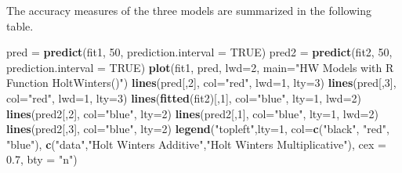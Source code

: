 \documentclass[
]{book}
\newenvironment{Shaded}{\begin{snugshade}}{\end{snugshade}}
\newcommand{\AttributeTok}[1]{\textcolor[rgb]{0.13,0.29,0.53}{#1}}
\newcommand{\ConstantTok}[1]{\textcolor[rgb]{0.56,0.35,0.01}{#1}}
\newcommand{\DecValTok}[1]{\textcolor[rgb]{0.00,0.00,0.81}{#1}}
\newcommand{\FloatTok}[1]{\textcolor[rgb]{0.00,0.00,0.81}{#1}}
\newcommand{\FunctionTok}[1]{\textcolor[rgb]{0.13,0.29,0.53}{\textbf{#1}}}
\newcommand{\NormalTok}[1]{#1}
\newcommand{\OtherTok}[1]{\textcolor[rgb]{0.56,0.35,0.01}{#1}}
\newcommand{\StringTok}[1]{\textcolor[rgb]{0.31,0.60,0.02}{#1}}
\begin{document}
The accuracy measures of the three models are summarized in the following table.

\begin{Shaded}
\begin{Highlighting}[]
\NormalTok{pred }\OtherTok{=} \FunctionTok{predict}\NormalTok{(fit1, }\DecValTok{50}\NormalTok{, }\AttributeTok{prediction.interval =} \ConstantTok{TRUE}\NormalTok{)}
\NormalTok{pred2 }\OtherTok{=} \FunctionTok{predict}\NormalTok{(fit2, }\DecValTok{50}\NormalTok{, }\AttributeTok{prediction.interval =} \ConstantTok{TRUE}\NormalTok{)}
\FunctionTok{plot}\NormalTok{(fit1, pred, }\AttributeTok{lwd=}\DecValTok{2}\NormalTok{, }\AttributeTok{main=}\StringTok{"HW Models with R Function HoltWinters()"}\NormalTok{)}
\FunctionTok{lines}\NormalTok{(pred[,}\DecValTok{2}\NormalTok{], }\AttributeTok{col=}\StringTok{"red"}\NormalTok{, }\AttributeTok{lwd=}\DecValTok{1}\NormalTok{, }\AttributeTok{lty=}\DecValTok{3}\NormalTok{)}
\FunctionTok{lines}\NormalTok{(pred[,}\DecValTok{3}\NormalTok{], }\AttributeTok{col=}\StringTok{"red"}\NormalTok{, }\AttributeTok{lwd=}\DecValTok{1}\NormalTok{, }\AttributeTok{lty=}\DecValTok{3}\NormalTok{)}
\FunctionTok{lines}\NormalTok{(}\FunctionTok{fitted}\NormalTok{(fit2)[,}\DecValTok{1}\NormalTok{], }\AttributeTok{col=}\StringTok{"blue"}\NormalTok{, }\AttributeTok{lty=}\DecValTok{1}\NormalTok{, }\AttributeTok{lwd=}\DecValTok{2}\NormalTok{)}
\FunctionTok{lines}\NormalTok{(pred2[,}\DecValTok{2}\NormalTok{], }\AttributeTok{col=}\StringTok{"blue"}\NormalTok{, }\AttributeTok{lty=}\DecValTok{2}\NormalTok{)}
\FunctionTok{lines}\NormalTok{(pred2[,}\DecValTok{1}\NormalTok{], }\AttributeTok{col=}\StringTok{"blue"}\NormalTok{, }\AttributeTok{lty=}\DecValTok{1}\NormalTok{, }\AttributeTok{lwd=}\DecValTok{2}\NormalTok{)}
\FunctionTok{lines}\NormalTok{(pred2[,}\DecValTok{3}\NormalTok{], }\AttributeTok{col=}\StringTok{"blue"}\NormalTok{, }\AttributeTok{lty=}\DecValTok{2}\NormalTok{)}
\FunctionTok{legend}\NormalTok{(}\StringTok{"topleft"}\NormalTok{,}\AttributeTok{lty=}\DecValTok{1}\NormalTok{, }\AttributeTok{col=}\FunctionTok{c}\NormalTok{(}\StringTok{"black"}\NormalTok{, }\StringTok{"red"}\NormalTok{, }\StringTok{"blue"}\NormalTok{),}
  \FunctionTok{c}\NormalTok{(}\StringTok{"data"}\NormalTok{,}\StringTok{"Holt Winters\textquotesingle{} Additive"}\NormalTok{,}\StringTok{"Holt Winters\textquotesingle{} Multiplicative"}\NormalTok{),}
  \AttributeTok{cex =} \FloatTok{0.7}\NormalTok{, }\AttributeTok{bty =} \StringTok{"n"}\NormalTok{)}
\end{Highlighting}
\end{Shaded}
\end{document}
